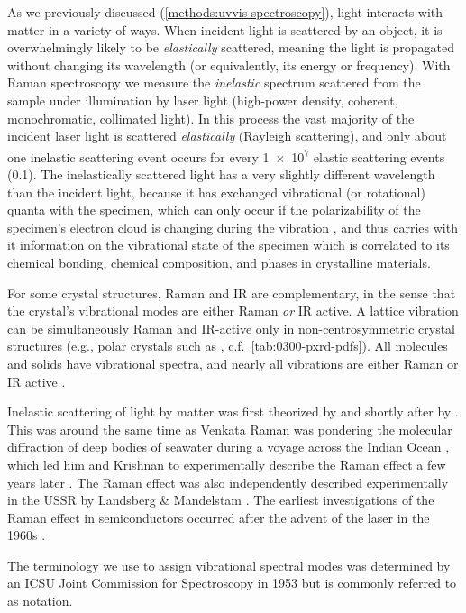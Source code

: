 \documentclass[draft,webedition,openright,titles,swedish,english]{LuaUUThesis}\usepackage[]{graphicx}\usepackage[]{xcolor}
\newcommand{\eg}{e.g.}
\newcommand{\cf}{c.f.}
\begin{document}
As we previously discussed (\cref{methods:uvvis-spectroscopy}), light interacts
with matter in a variety of ways.
When incident light is scattered by an object, it is overwhelmingly likely to
be \emph{elastically} scattered, meaning the light is propagated without changing
its wavelength (or equivalently, its energy or frequency).
With Raman spectroscopy we measure the \emph{inelastic} spectrum scattered from the
sample under illumination by laser light (high-power density, coherent, monochromatic, collimated light).
In this process the vast majority of the incident laser light is scattered
\emph{elastically} (Rayleigh scattering), and only about one inelastic scattering event
occurs for every \num[retain-unity-mantissa=false]{1e7} elastic scattering events (\qty{0.1}{\ppm}).
The inelastically scattered light has a very slightly different wavelength than the incident light,
because it has exchanged vibrational (or rotational) quanta with the specimen, which
can only occur if the polarizability of the specimen's electron cloud is changing
during the vibration \cite{Rahman2020a}, and thus carries with it information on the vibrational state
of the specimen which is correlated to its chemical bonding, chemical composition,
and phases in crystalline materials.

For some crystal structures, Raman and \gls{IR} are complementary, in the sense
that the crystal's vibrational modes are either Raman \emph{or} \gls{IR} active.
A lattice vibration can be simultaneously Raman and \gls{IR}-active only in
non-centrosymmetric crystal structures (\eg, polar crystals such as \ZnO,
\cf\ \cref{tab:0300-pxrd-pdfs}).
All molecules and solids have vibrational spectra, and nearly all vibrations
are either Raman or \gls{IR} active \cite{Dyer2005}.

Inelastic scattering of light by matter was first theorized by \textcite{Smekal1923} and
shortly after by \textcite{Kramers1924,Kramers1924a,Kramers1925}. This was around
the same time as Venkata Raman was pondering the molecular diffraction of deep bodies
of seawater during a voyage across the Indian Ocean \cite{Raman1922},
which led him and Krishnan to experimentally describe the Raman effect a few years later
\cite{Raman1928,Raman1928a}. The Raman effect was also independently described
experimentally in the USSR by Landsberg \& Mandelstam \cite{Landsberg1928,Landsberg1928a}.
The earliest investigations of the Raman effect in semiconductors occurred after
the advent of the laser in the 1960s \cite{Cardona1974}.

The terminology we use to assign vibrational spectral modes was determined
by an ICSU Joint Commission for Spectroscopy in 1953 \cite{Cohen2008} but is
commonly referred to as \textcite{Mulliken1930,Mulliken1955,Mulliken1956} notation.
\end{document}
